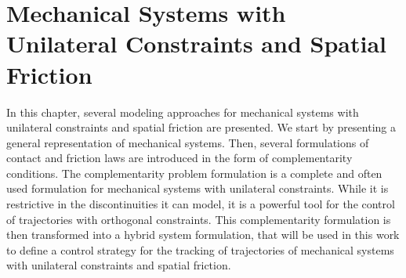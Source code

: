 \documentclass[../DC2017114Bouma.tex]{subfiles}
\begin{document}
\graphicspath{{02_Material/img/}}
\renewcommand{\chaptermark}[1]{\markboth{\thechapter.\ #1}{}}
\renewcommand{\sectionmark}[1]{\markright{#1}{}}
\pagestyle{fancyreport}
\cleartooddpage
\pagestyle{fancyreport}
\chapter{Mechanical Systems with Unilateral Constraints and Spatial Friction}\label{ch:model}
%
%
%
%
%
%
%
%
%
%
%
%
%
%
%
%
%
%
%
%
In this chapter, several modeling approaches for mechanical systems with unilateral constraints and spatial friction are presented. We start by presenting a general representation of mechanical systems. Then, several formulations of contact and friction laws are introduced in the form of complementarity conditions. The complementarity problem formulation is a complete and often used formulation for mechanical systems with unilateral constraints. While it is restrictive in the discontinuities it can model, it is a powerful tool for the control of trajectories with orthogonal constraints. This complementarity formulation is then transformed into a hybrid system formulation, that will be used in this work to define a control strategy for the tracking of trajectories of mechanical systems with unilateral constraints and spatial friction.
\end{document}
